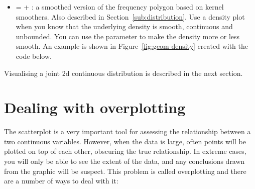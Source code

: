 \begin{itemize}
  \item {} =  + : a smoothed version of the frequency polygon based on kernel smoothers. Also described in Section~\ref{sub:distribution}. Use a density plot when you know that the underlying density is smooth, continuous and unbounded. You can use the  parameter to make the density more or less smooth. An example is shown in Figure~\ref{fig:geom-density} created with the code below.

    

\end{itemize}

Visualising a joint 2d continuous distribution is described in the next section.

\section{Dealing with overplotting}
\label{sec:overplotting}

The scatterplot is a very important tool for assessing the relationship between a two continuous variables.  However, when the data is large, often points will be plotted on top of each other, obscuring the true relationship.  In extreme cases, you will only be able to see the extent of the data, and any conclusions drawn from the graphic will be suspect.  This problem is called overplotting and there are a number of ways to deal with it:

